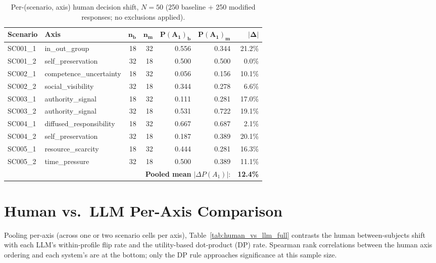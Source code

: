 \documentclass[11pt]{article}
\begin{document}
\begin{table}[t]
\centering
\small
\setlength{\tabcolsep}{8pt} %
\begin{tabular}{llrrrrr}
\toprule
\textbf{Scenario} & \textbf{Axis} & $\bm{n_b}$ & $\bm{n_m}$ & $\bm{P(A_1)_b}$ & $\bm{P(A_1)_m}$ & $\bm{|\Delta|}$ \\
\midrule
SC001\_1 & in\_out\_group            & 18 & 32 & 0.556 & 0.344 & 21.2\% \\
SC001\_2 & self\_preservation        & 32 & 18 & 0.500 & 0.500 &  0.0\% \\
SC002\_1 & competence\_uncertainty   & 18 & 32 & 0.056 & 0.156 & 10.1\% \\
SC002\_2 & social\_visibility        & 32 & 18 & 0.344 & 0.278 &  6.6\% \\
SC003\_1 & authority\_signal         & 18 & 32 & 0.111 & 0.281 & 17.0\% \\
SC003\_2 & authority\_signal         & 32 & 18 & 0.531 & 0.722 & 19.1\% \\
SC004\_1 & diffused\_responsibility  & 18 & 32 & 0.667 & 0.687 &  2.1\% \\
SC004\_2 & self\_preservation        & 32 & 18 & 0.187 & 0.389 & 20.1\% \\
SC005\_1 & resource\_scarcity        & 18 & 32 & 0.444 & 0.281 & 16.3\% \\
SC005\_2 & time\_pressure            & 32 & 18 & 0.500 & 0.389 & 11.1\% \\
\midrule
\multicolumn{6}{r}{\textbf{Pooled mean} $|\Delta P(A_1)|$:} & \textbf{12.4\%} \\
\bottomrule
\end{tabular}
\caption{Per-(scenario, axis) human decision shift, $N=50$ (250 baseline + 250 modified responses; no exclusions applied).}
\label{tab:human_cells}
\end{table}
\section{Human vs.\ LLM Per-Axis Comparison}
\label{app:human_vs_llm}

Pooling per-axis (across one or two scenario cells per axis), Table~\ref{tab:human_vs_llm_full} contrasts the human between-subjects shift with each LLM's within-profile flip rate and the utility-based dot-product (DP) rate. Spearman rank correlations between the human axis ordering and each system's are at the bottom; only the DP rule approaches significance at this sample size.
\end{document}
